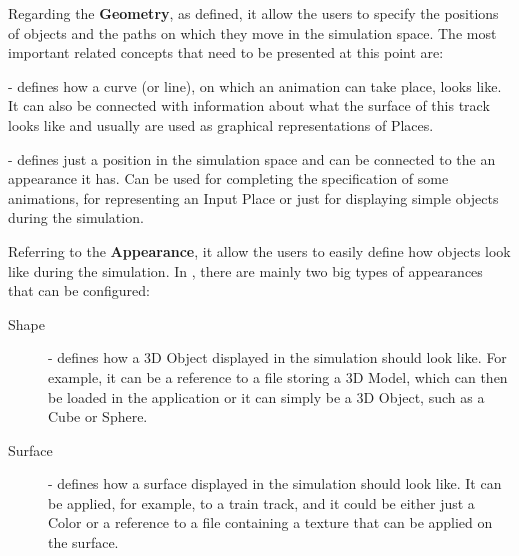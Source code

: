 Regarding the \textbf{Geometry}, as defined, it allow the users to specify the positions of objects
and the paths on which they move in the simulation space. The most important related concepts that
need to be presented at this point are:
\begin{description}
\item[Track] - defines how a curve (or line), on which an animation can take place, looks like. It
can also be connected with information about what the surface of this track looks like and usually
are used as graphical representations of Places.
\item[Simple Position] - defines just a position in the simulation space and can be connected to the
an appearance it has. Can be used for completing the specification of some animations, for
representing an Input Place or just for displaying simple objects during the simulation.
\end{description}

Referring to the \textbf{Appearance}, it allow the users to easily define how objects look like
during the simulation. In \epns, there are mainly two big types of appearances that can be
configured:
\begin{description}
\item[Shape] - defines how a 3D Object displayed in the simulation should look like. For example, it
can be a reference to a file storing a 3D Model, which can then be loaded in the application or it
can simply be a 3D Object, such as a Cube or Sphere.
\item[Surface] - defines how a surface displayed in the simulation should look like. It can be
applied, for example, to a train track, and it could be either just a Color or a reference to a file
containing a texture that can be applied on the surface.
\end{description}


